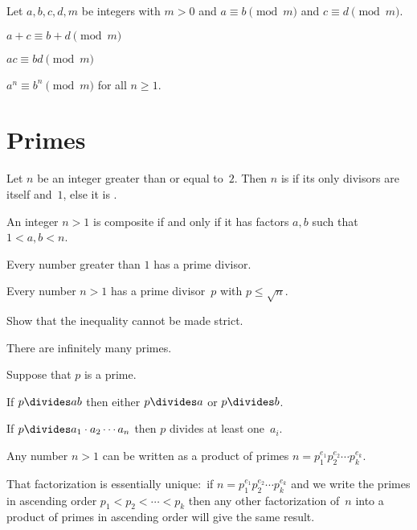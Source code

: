 \documentclass{ibl}
\begin{document}
\begin{ex}
Let $a,b,c,d,m$ be integers with $m>0$ and
$a\equiv b\pmod m$ and $c\equiv d\pmod m$.
\begin{exes}
\item $a+c\equiv b+d\pmod m$
\item $ac\equiv bd\pmod m$
\item $a^n\equiv b^n\pmod m$ for all $n\geq 1$.    
\end{exes}
\end{ex}


\section{Primes}
\begin{df}
Let $n$ be an integer greater than or equal to~$2$.
Then $n$ is  if its only divisors are itself and~$1$,
else it is .  
\end{df}

\begin{ex}\pord
An integer $n>1$ is composite if and only if it has factors $a,b$ such that
$1<a,b<n$.  
\end{ex}

\begin{ex}
\begin{exes}
\item Every number greater than $1$ has a prime divisor.
\item Every number $n>1$ has a prime divisor~$p$ with $p\leq \sqrt{n}$.
\item Show that the inequality cannot be made strict.     
\end{exes}
\end{ex}

\begin{ex}
There are infinitely many primes.  
\end{ex}

\begin{ex} Suppose that $p$ is a prime.
\begin{exes}
\item If  $p\divides ab$ then either $p\divides a$ or
$p\divides b$.
\item If $p\divides a_1\cdot a_2\cdots a_n$ then 
$p$ divides at least one~$a_i$.    
\end{exes}
\end{ex}

\begin{ex}
\begin{exes}
\item Any number $n>1$ can be written as a product of primes
$n=p_1^{e_1}p_2^{e_2}\cdots p_k^{e_k}$.
\item That factorization is essentially unique:~if 
$n=p_1^{e_1}p_2^{e_2}\cdots p_k^{e_k}$ and we write the primes
in ascending order $p_1<p_2<\cdots<p_k$ then any other
factorization of~$n$ into a product of primes in ascending order will give the
same result.      
\end{exes}
\end{ex}
\end{document}
